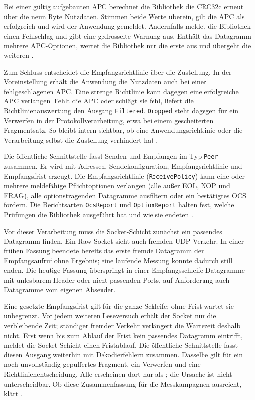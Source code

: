 Bei einer gültig aufgebauten APC berechnet die Bibliothek die CRC32c erneut über die neun
Byte Nutzdaten. Stimmen beide Werte überein, gilt die APC als erfolgreich und wird der Anwendung
gemeldet. Andernfalls meldet die Bibliothek einen Fehlschlag und gibt eine gedrosselte Warnung aus.
Enthält das Datagramm mehrere APC-Optionen, wertet die Bibliothek nur die erste aus und übergeht die
weiteren \cite[Sec.~10]{rfc9868}.

Zum Schluss entscheidet die Empfangsrichtlinie über die Zustellung. In der Voreinstellung erhält die
Anwendung die Nutzdaten auch bei einer fehlgeschlagenen APC. Eine strenge Richtlinie kann dagegen eine
erfolgreiche APC verlangen. Fehlt die APC oder schlägt sie fehl, liefert die Richtlinienauswertung den
Ausgang \texttt{Filtered}. \texttt{Dropped} steht dagegen für ein Verwerfen in der
Protokollverarbeitung, etwa bei einem gescheiterten Fragmentsatz. So bleibt intern sichtbar, ob eine
Anwendungsrichtlinie oder die Verarbeitung selbst die Zustellung verhindert hat
\cite[Sec.~11.3, 14 und 19]{rfc9868}.

Die öffentliche Schnittstelle fasst Senden und Empfangen im Typ \texttt{Peer} zusammen. Er wird mit
Adressen, Sendekonfiguration, Empfangsrichtlinie und Empfangsfrist erzeugt. Die Empfangsrichtlinie
(\texttt{ReceivePolicy}) kann eine oder mehrere meldefähige Pflicht\-optionen verlangen (alle außer EOL,
NOP und FRAG), alle options\-tragenden Datagramme ausfiltern oder ein bestätigtes OCS fordern. Die
Berichtsarten \texttt{OcsReport} und \texttt{OptionReport} halten fest, welche Prüfungen die Bibliothek
ausgeführt hat und wie sie endeten \cite[Sec.~14 und 15]{rfc9868}.

Vor dieser Verarbeitung muss die Socket-Schicht zunächst ein passendes Datagramm finden. Ein Raw Socket
sieht auch fremden UDP-Verkehr. In einer frühen Fassung beendete bereits das erste fremde Datagramm den
Empfangsaufruf ohne Ergebnis; eine laufende Messung konnte dadurch still enden. Die heutige Fassung
überspringt in einer Empfangsschleife Datagramme mit unlesbarem Header oder nicht passenden Ports, auf
Anforderung auch Datagramme vom eigenen Absender.

Eine gesetzte Empfangsfrist gilt für die ganze Schleife; ohne Frist wartet sie unbegrenzt. Vor jedem
weiteren Leseversuch erhält der Socket nur die verbleibende Zeit; ständiger fremder Verkehr verlängert die
Wartezeit deshalb nicht. Erst wenn bis zum Ablauf der Frist kein passendes Datagramm eintrifft, meldet die
Socket-Schicht einen Fristablauf. Die öffentliche Schnittstelle fasst diesen Ausgang weiterhin mit
Dekodierfehlern zusammen. Dasselbe gilt für ein noch unvollständig gepuffertes Fragment, ein
Verwerfen und eine Richtlinienentscheidung. Alle erscheinen dort nur als ; die
Ursache ist nicht unterscheidbar. Ob diese Zusammenfassung für die Messkampagnen ausreicht, klärt
.

